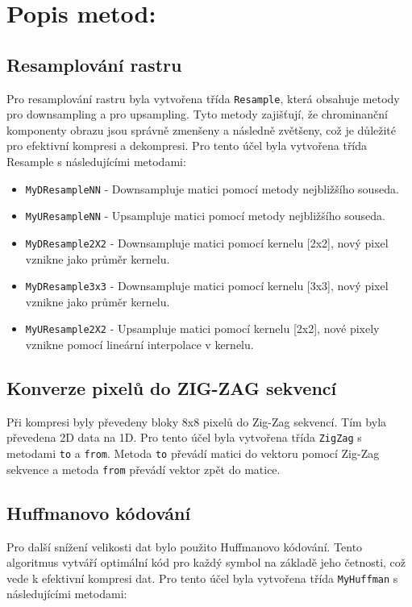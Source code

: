 \section{Popis metod:}
\subsection{Resamplování rastru}

Pro resamplování rastru byla vytvořena třída \texttt{Resample}, která obsahuje metody pro downsampling a pro upsampling. Tyto metody zajišťují, že chrominanční komponenty obrazu jsou správně zmenšeny a následně zvětšeny, což je důležité pro efektivní kompresi a dekompresi. Pro tento účel byla
vytvořena třída Resample s následujícími metodami:
\begin{itemize}
    \item \texttt{MyDResampleNN} - Downsampluje matici pomocí metody nejbližšího souseda.
    \item \texttt{MyUResampleNN}  - Upsampluje matici pomocí metody nejbližšího souseda.
    \item \texttt{MyDResample2X2} - Downsampluje matici pomocí kernelu [2x2], nový pixel vznikne jako průměr kernelu.
    \item \texttt{MyDResample3x3} - Downsampluje matici pomocí kernelu [3x3], nový pixel vznikne jako průměr kernelu.
    \item \texttt{MyUResample2X2} - Upsampluje matici pomocí kernelu [2x2], nové pixely vznikne pomocí lineární interpolace v kernelu.
\end{itemize}

\subsection{Konverze pixelů do ZIG-ZAG sekvencí}

Při kompresi byly převedeny bloky 8x8 pixelů do Zig-Zag sekvencí. Tím byla převedena 2D data na 1D. Pro tento účel byla vytvořena třída \texttt{ZigZag} s metodami \texttt{to} a \texttt{from}. Metoda \texttt{to} převádí matici do vektoru pomocí Zig-Zag sekvence a metoda \texttt{from} převádí vektor zpět do matice.

\subsection{Huffmanovo kódování}

Pro další snížení velikosti dat bylo použito Huffmanovo kódování. Tento algoritmus vytváří optimální kód pro každý symbol na základě jeho četnosti, což vede k efektivní kompresi dat. Pro tento účel byla vytvořena třída \texttt{MyHuffman} s následujícími metodami:


